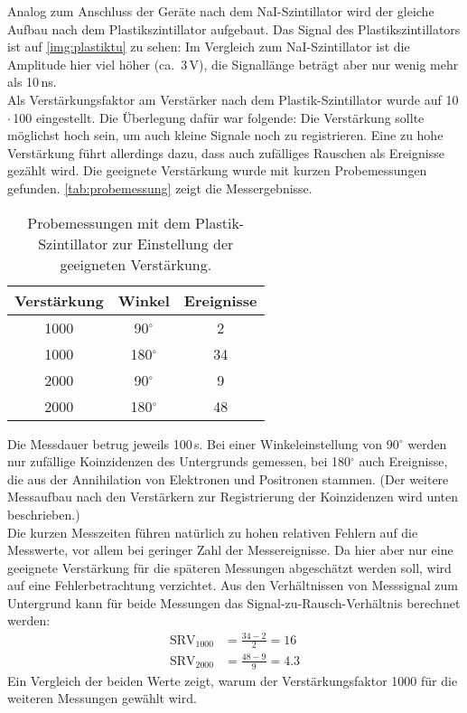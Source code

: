 Analog zum Anschluss der Geräte nach dem NaI-Szintillator wird der gleiche Aufbau nach dem Plastikszintillator
aufgebaut. Das Signal des Plastikszintillators ist auf \autoref{img:plastiktu} zu sehen:
Im Vergleich zum NaI-Szintillator ist die Amplitude hier viel höher (ca.~3\,V),
die Signallänge beträgt aber nur wenig mehr als 10\,ns.\\
Als Verstärkungsfaktor am Verstärker nach dem Plastik-Szintillator wurde auf 10\,$\cdot$\,100 eingestellt.
Die Überlegung dafür war folgende: Die Verstärkung sollte möglichst hoch sein,
um auch kleine Signale noch zu registrieren.
Eine zu hohe Verstärkung führt allerdings dazu, dass auch zufälliges Rauschen als Ereignisse gezählt wird.
Die geeignete Verstärkung wurde mit kurzen Probemessungen gefunden.
\autoref{tab:probemessung} zeigt die Messergebnisse.
\begin{table}[H]
\caption{Probemessungen mit dem Plastik-Szintillator zur Einstellung der geeigneten Verstärkung.}
\begin{center}
\begin{tabular}{|c|c|c|}
  \hline
  Verstärkung & Winkel & Ereignisse \\ \hline
  1000 & 90$^\circ$ & 2  \\ \hline
  1000 & 180$^\circ$ & 34  \\ \hline
  2000 & 90$^\circ$ & 9  \\ \hline
  2000 & 180$^\circ$ & 48  \\ \hline
\end{tabular}
\end{center}
\label{tab:probemessung}
\end{table}
Die Messdauer betrug jeweils 100\,s.
Bei einer Winkeleinstellung von 90$^\circ$ werden nur zufällige Koinzidenzen
des Untergrunds gemessen, bei 180$^\circ$ auch Ereignisse, die aus der Annihilation von Elektronen
und Positronen stammen.
(Der weitere Messaufbau nach den Verstärkern zur Registrierung der Koinzidenzen wird unten beschrieben.)\\
Die kurzen Messzeiten führen natürlich zu hohen relativen Fehlern auf die Messwerte,
vor allem bei geringer Zahl der Messereignisse.
Da hier aber nur eine geeignete Verstärkung für die späteren Messungen abgeschätzt werden soll,
wird auf eine Fehlerbetrachtung verzichtet.
Aus den Verhältnissen von Messsignal zum Untergrund kann für beide Messungen das
Signal-zu-Rausch-Verhältnis berechnet werden:
\begin{equation}
  \begin{split}
  \text{SRV}_{1000} & = \frac{34-2}{2} = 16 \\
   \text{SRV}_{2000} & = \frac{48-9}{9} = 4.3
  \end{split}
\end{equation}
Ein Vergleich der beiden Werte zeigt, warum der Verstärkungsfaktor 1000 für die weiteren Messungen gewählt wird.\\

